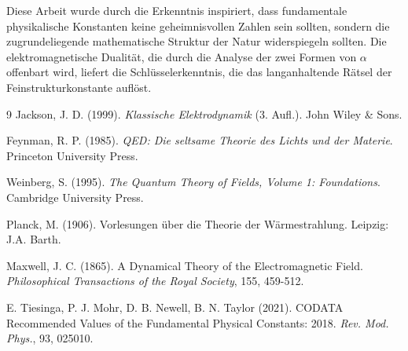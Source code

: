 	Diese Arbeit wurde durch die Erkenntnis inspiriert, dass fundamentale physikalische Konstanten keine geheimnisvollen Zahlen sein sollten, sondern die zugrundeliegende mathematische Struktur der Natur widerspiegeln sollten. Die elektromagnetische Dualität, die durch die Analyse der zwei Formen von $\alpha$ offenbart wird, liefert die Schlüsselerkenntnis, die das langanhaltende Rätsel der Feinstrukturkonstante auflöst.
	
	\begin{thebibliography}{9}
		 Jackson, J. D. (1999). \textit{Klassische Elektrodynamik} (3. Aufl.). John Wiley \& Sons.
		
		 Feynman, R. P. (1985). \textit{QED: Die seltsame Theorie des Lichts und der Materie}. Princeton University Press.
		
		 Weinberg, S. (1995). \textit{The Quantum Theory of Fields, Volume 1: Foundations}. Cambridge University Press.
		
		 Planck, M. (1906). Vorlesungen über die Theorie der Wärmestrahlung. Leipzig: J.A. Barth.
		
		 Maxwell, J. C. (1865). A Dynamical Theory of the Electromagnetic Field. \textit{Philosophical Transactions of the Royal Society}, 155, 459-512.
		
		 E. Tiesinga, P. J. Mohr, D. B. Newell, B. N. Taylor (2021). CODATA Recommended Values of the Fundamental Physical Constants: 2018. \textit{Rev. Mod. Phys.}, 93, 025010.
	\end{thebibliography}
	